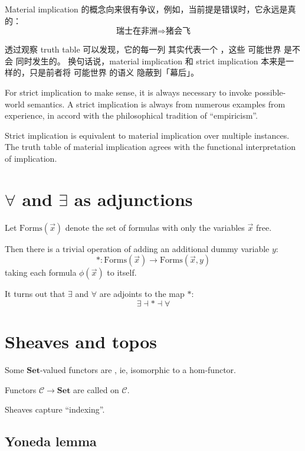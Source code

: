 Material implication 的概念向来很有争议，例如，当前提是错误时，它永远是真的： 
\begin{equation}
\mbox{瑞士在非洲} \Rightarrow \mbox{猪会飞}
\end{equation}

透过观察 truth table 可以发现，它的每一列 其实代表一个 ，这些 可能世界 是不会 同时发生的。 换句话说，material implication 和 strict implication 本来是一样的，只是前者将 可能世界 的语义 隐蔽到「幕后」。 

For strict implication to make sense, it is always necessary to invoke possible-world semantics.  A strict implication is always  from numerous examples from experience, in accord with the philosophical tradition of ``empiricism''.

Strict implication is equivalent to material implication over multiple instances.  The truth table of material implication agrees with the functional interpretation of implication.  

\section{$\forall$ and $\exists$ as adjunctions}

Let $\mbox{Forms}(\vec{x})$ denote the set of formulas with only the variables $\vec{x}$ free.

Then there is a trivial operation of adding an additional dummy variable $y$:
\begin{equation}
* : \mbox{Forms}(\vec{x}) \rightarrow \mbox{Forms}(\vec{x}, y)
\end{equation}
taking each formula $\phi(\vec{x})$ to itself.

It turns out that $\exists$ and $\forall$ are adjoints to the map $*$:
\begin{equation}
 \exists \dashv * \dashv \forall
\end{equation}

\section{Sheaves and topos}

Some $\mathbf{Set}$-valued functors are , ie, isomorphic to a hom-functor.

Functors $\mathcal{C} \rightarrow \mathbf{Set}$ are called  on $\mathcal{C}$.

Sheaves capture ``indexing''.

\subsection{Yoneda lemma}

